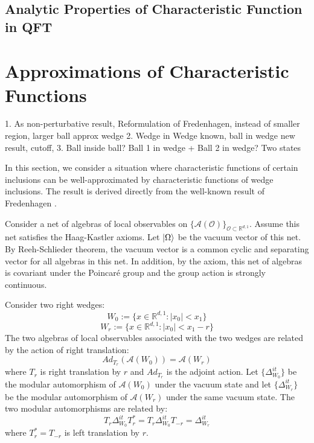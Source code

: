 \documentclass[a4paper,11pt]{article}
\theoremstyle{definition}
\begin{document}
\subsection{Analytic Properties of Characteristic Function in QFT}


\section{Approximations of Characteristic Functions}\label{section:approx}
1. As non-perturbative result, Reformulation of Fredenhagen, instead of smaller region, larger ball approx wedge 2. Wedge in Wedge known, ball in wedge new result, cutoff, 3. Ball inside ball? Ball 1 in wedge + Ball 2 in wedge? Two states

In this section, we consider a situation where characteristic functions of certain inclusions can be well-approximated by characteristic functions of wedge inclusions. The result is derived directly from the well-known result of Fredenhagen \cite{fredenhagen}.

Consider a net of algebras of local observables on $\{\mathcal{A}(\mathcal{O})\}_{\mathcal{O}\subset\mathbb{R}^{d,1}}$. Assume this net satisfies the Haag-Kastler axioms. Let $\ket{\Omega}$ be the vacuum vector of this net. By Reeh-Schlieder theorem, the vacuum vector is a common cyclic and separating vector for all algebras in this net. In addition, by the axiom, this net of algebras is covariant under the Poincaré group and the group action is strongly continuous.

Consider two right wedges:
\begin{equation}
    W_0 := \{x\in\mathbb{R}^{d,1}: |x_0| < x_1\}
\end{equation}
\begin{equation}
    W_{r} := \{x\in\mathbb{R}^{d,1}: |x_0 | < x_1 - r \}
\end{equation}
The two algebras of local observables associated with the two wedges are related by the action of right translation:
\begin{equation}
    Ad_{T_r}(\mathcal{A}(W_0)) = \mathcal{A}(W_r)
\end{equation}
where $T_r$ is right translation by $r$ and $Ad_{T_r}$ is the adjoint action. Let $\{\Delta_{W_0}^{it}\}$ be the modular automorphism of $\mathcal{A}(W_0)$ under the vacuum state and let $\{\Delta_{W_r}^{it}\}$ be the modular automorphism of $\mathcal{A}(W_r)$ under the same vacuum state. The two modular automorphisms are related by:
\begin{equation}
    T_r\Delta_{W_0}^{it}T_r^* = T_r\Delta_{W_0}^{it}T_{-r} = \Delta^{it}_{W_r}
\end{equation}
where $T_r^* = T_{-r}$ is left translation by $r$.
\end{document}
